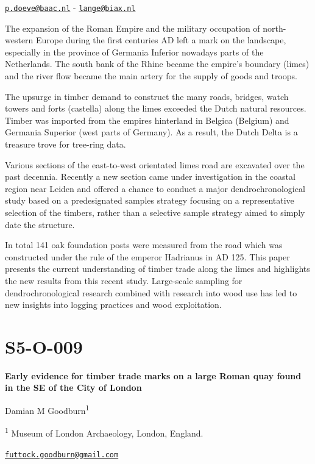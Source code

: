\documentclass[
]{book}
\begin{document}
\href{mailto:p.doeve@baac.nl}{\nolinkurl{p.doeve@baac.nl}} - \href{mailto:lange@biax.nl}{\nolinkurl{lange@biax.nl}}

The expansion of the Roman Empire and the military occupation of north-western Europe during the first centuries AD left a mark on the landscape, especially in the province of Germania Inferior nowadays parts of the Netherlands. The south bank of the Rhine became the empire's boundary (limes) and the river flow became the main artery for the supply of goods and troops.

The upsurge in timber demand to construct the many roads, bridges, watch towers and forts (castella) along the limes exceeded the Dutch natural resources. Timber was imported from the empires hinterland in Belgica (Belgium) and Germania Superior (west parts of Germany). As a result, the Dutch Delta is a treasure trove for tree-ring data.

Various sections of the east-to-west orientated limes road are excavated over the past decennia. Recently a new section came under investigation in the coastal region near Leiden and offered a chance to conduct a major dendrochronological study based on a predesignated samples strategy focusing on a representative selection of the timbers, rather than a selective sample strategy aimed to simply date the structure.

In total 141 oak foundation posts were measured from the road which was constructed under the rule of the emperor Hadrianus in AD 125. This paper presents the current understanding of timber trade along the limes and highlights the new results from this recent study. Large-scale sampling for dendrochronological research combined with research into wood use has led to new insights into logging practices and wood exploitation.

\hypertarget{s5-o-009}{%
\section*{S5-O-009}\label{s5-o-009}}

\textbf{Early evidence for timber trade marks on a large Roman quay found in the SE of the City of London}

Damian M Goodburn\textsuperscript{1}

\textsuperscript{1} Museum of London Archaeology, London, England.

\href{mailto:futtock.goodburn@gmail.com}{\nolinkurl{futtock.goodburn@gmail.com}}
\end{document}
